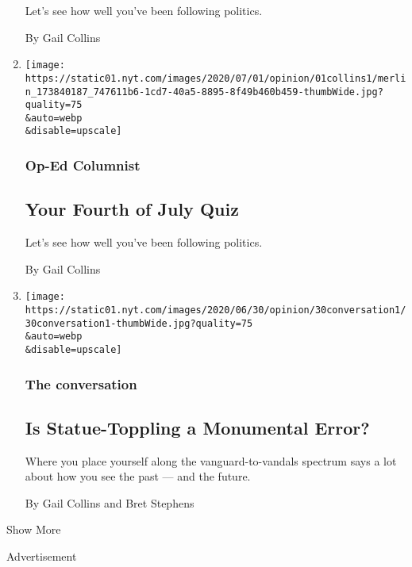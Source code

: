 \begin{enumerate}
  Let's see how well you've been following politics.

  By Gail Collins
\item
  \href{/interactive/2020/07/01/opinion/4th-of-july-quiz.html}{}

  \texttt{[image: https://static01.nyt.com/images/2020/07/01/opinion/01collins1/merlin\_173840187\_747611b6-1cd7-40a5-8895-8f49b460b459-thumbWide.jpg?quality=75\\\&auto=webp\\\&disable=upscale]}

  \hypertarget{op-ed-columnist-1}{%
  \subsubsection{Op-Ed Columnist}\label{op-ed-columnist-1}}

  \hypertarget{your-fourth-of-july-quiz-1}{%
  \subsection{Your Fourth of July
  Quiz}\label{your-fourth-of-july-quiz-1}}

  Let's see how well you've been following politics.

  By Gail Collins
\item
  \href{/2020/06/30/opinion/statues-protesters-jefferson-jackson.html}{}

  \texttt{[image: https://static01.nyt.com/images/2020/06/30/opinion/30conversation1/30conversation1-thumbWide.jpg?quality=75\\\&auto=webp\\\&disable=upscale]}

  \hypertarget{the-conversation-4}{%
  \subsubsection{The conversation}\label{the-conversation-4}}

  \hypertarget{is-statue-toppling-a-monumental-error}{%
  \subsection{Is Statue-Toppling a Monumental
  Error?}\label{is-statue-toppling-a-monumental-error}}

  Where you place yourself along the vanguard-to-vandals spectrum says a
  lot about how you see the past --- and the future.

  By Gail Collins and Bret Stephens
\end{enumerate}

Show More

Advertisement

